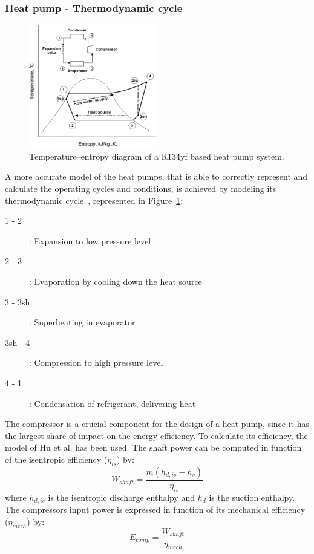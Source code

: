 \documentclass{article}
\begin{document}


\subsubsection{Heat pump - Thermodynamic cycle}\label{sss:hp_thermo}

\begin{figure}[htp]
	\centering
	\includegraphics[width=0.5\textwidth]{HP_cylce_ref.png}
	\caption{Temperature–entropy diagram of a R134yf based heat pump system.}
	\label{fig:hp_ref}
\end{figure}

A more accurate model of the heat pumps, that is able to correctly represent and calculate the operating cycles and conditions, is achieved by modeling its thermodynamic cycle~\cite{demierreModelingExperimentalInvestigation2014}, represented in Figure~\ref{fig:hp_ref}:

\begin{description}
	\item [1 - 2]: Expansion to low pressure level
	\item [2 - 3]: Evaporation by cooling down the heat source
	\item [3 - 3sh]: Superheating in evaporator
	\item [3sh - 4]: Compression to high pressure level
	\item [4 - 1]: Condensation of refrigerant, delivering heat
\end{description}

The compressor is a crucial component for the design of a heat pump, since it has the largest share of impact on the energy efficiency. To calculate its efficiency, the model of Hu et al.\cite{huExtremumSeekingControl2015} has been used. The shaft power can be computed in function of the isentropic efficiency ($\eta_{is}$) by:
\begin{equation}
W_{shaft} = \frac{\dot{m}(h_{d,is}-h_{s})}{\eta_{is}} 
\end{equation}
where $h_{d,is}$ is the isentropic discharge enthalpy and $h_{d}$ is the suction enthalpy. The compressors input power is expressed in function of its mechanical efficiency ($\eta_{mech}$) by:
\begin{equation}
E_{comp} = \frac{W_{shaft}}{\eta_{mech}}  
\end{equation}
\end{document}
